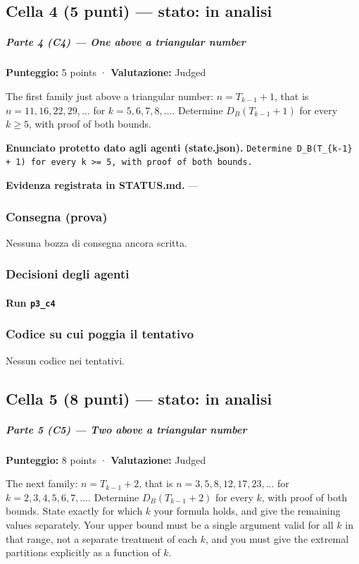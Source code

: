 \documentclass[11pt,a4paper]{article}
\begin{document}
\subsection{Cella 4 (5 punti) — stato: in analisi}
\subparagraph{Parte 4 (C4) --- One above a triangular
number}\label{parte-4-c4-one-above-a-triangular-number}

\textbf{Punteggio:} 5 points · \textbf{Valutazione:} Judged

The first family just above a triangular number: \(n = T_{k-1} + 1\),
that is \(n = 11, 16, 22, 29, \ldots\) for \(k = 5, 6, 7, 8, \ldots\).
Determine \(D_B(T_{k-1} + 1)\) for every \(k \ge 5\), with proof of both
bounds.

\textbf{Enunciato protetto dato agli agenti (state.json).} \texttt{Determine D\_B(T\_\{k-1\} + 1) for every k \textgreater{}= 5, with proof of both bounds.}

\textbf{Evidenza registrata in STATUS.md.} —

\subsubsection{Consegna (prova)}
Nessuna bozza di consegna ancora scritta.

\subsubsection{Decisioni degli agenti}
\paragraph{Run \texttt{p3\_c4}}

\subsubsection{Codice su cui poggia il tentativo}
Nessun codice nei tentativi.

\subsection{Cella 5 (8 punti) — stato: in analisi}
\subparagraph{Parte 5 (C5) --- Two above a triangular
number}\label{parte-5-c5-two-above-a-triangular-number}

\textbf{Punteggio:} 8 points · \textbf{Valutazione:} Judged

The next family: \(n = T_{k-1} + 2\), that is
\(n = 3, 5, 8, 12, 17, 23, \ldots\) for
\(k = 2, 3, 4, 5, 6, 7, \ldots\). Determine \(D_B(T_{k-1} + 2)\) for
every \(k\), with proof of both bounds. State exactly for which \(k\)
your formula holds, and give the remaining values separately. Your upper
bound must be a single argument valid for all \(k\) in that range, not a
separate treatment of each \(k\), and you must give the extremal
partitions explicitly as a function of \(k\).
\end{document}
